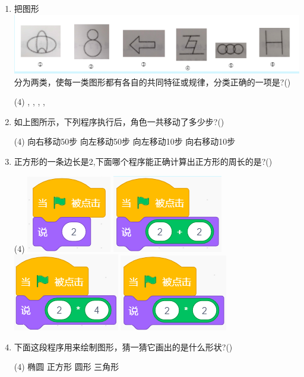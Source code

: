 \documentclass[10pt, a4paper]{article}
\begin{document}
\begin{enumerate}
        \item 把图形\includegraphics[width=.3\textwidth]{13.png}分为两类，使每一类图形都有各自的共同特征或规律，分类正确的一项是?(\qquad)
        \begin{tasks}(4)
            \task {},
            \task {},
            \task {},
            \task {},
        \end{tasks}

        \item 如上图所示，下列程序执行后，角色一共移动了多少步?(\qquad)
        \begin{tasks}(4)
            \task 向右移动50步
            \task 向左移动50步
            \task 向左移动10步
            \task 向右移动10步
        \end{tasks}

        \item 正方形的一条边长是2,下面哪个程序能正确计算出正方形的周长的是?(\qquad)
        \begin{tasks}(4)
            \task \includegraphics[width=.08\textwidth]{15a.png}
            \task \includegraphics[width=.1\textwidth]{15b.png}
            \task \includegraphics[width=.1\textwidth]{15c.png}
            \task \includegraphics[width=.1\textwidth]{15d.png}
        \end{tasks}

        \item 下面这段程序用来绘制图形，猜一猜它画出的是什么形状?(\qquad)
        \begin{tasks}(4)
            \task 椭圆
            \task 正方形
            \task 圆形
            \task 三角形
        \end{tasks}


\end{enumerate}
\end{document}
